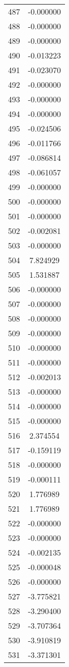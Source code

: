 \documentclass[12pt]{article}
\begin{document}
\begin{longtable}{@{}cc@{}}
487 & -0.000000 \\
488 & -0.000000 \\
489 & -0.000000 \\
490 & -0.013223 \\
491 & -0.023070 \\
492 & -0.000000 \\
493 & -0.000000 \\
494 & -0.000000 \\
495 & -0.024506 \\
496 & -0.011766 \\
497 & -0.086814 \\
498 & -0.061057 \\
499 & -0.000000 \\
500 & -0.000000 \\
501 & -0.000000 \\
502 & -0.002081 \\
503 & -0.000000 \\
504 & 7.824929 \\
505 & 1.531887 \\
506 & -0.000000 \\
507 & -0.000000 \\
508 & -0.000000 \\
509 & -0.000000 \\
510 & -0.000000 \\
511 & -0.000000 \\
512 & -0.002013 \\
513 & -0.000000 \\
514 & -0.000000 \\
515 & -0.000000 \\
516 & 2.374554 \\
517 & -0.159119 \\
518 & -0.000000 \\
519 & -0.000111 \\
520 & 1.776989 \\
521 & 1.776989 \\
522 & -0.000000 \\
523 & -0.000000 \\
524 & -0.002135 \\
525 & -0.000048 \\
526 & -0.000000 \\
527 & -3.775821 \\
528 & -3.290400 \\
529 & -3.707364 \\
530 & -3.910819 \\
531 & -3.371301 \\

\end{longtable}
\end{document}
